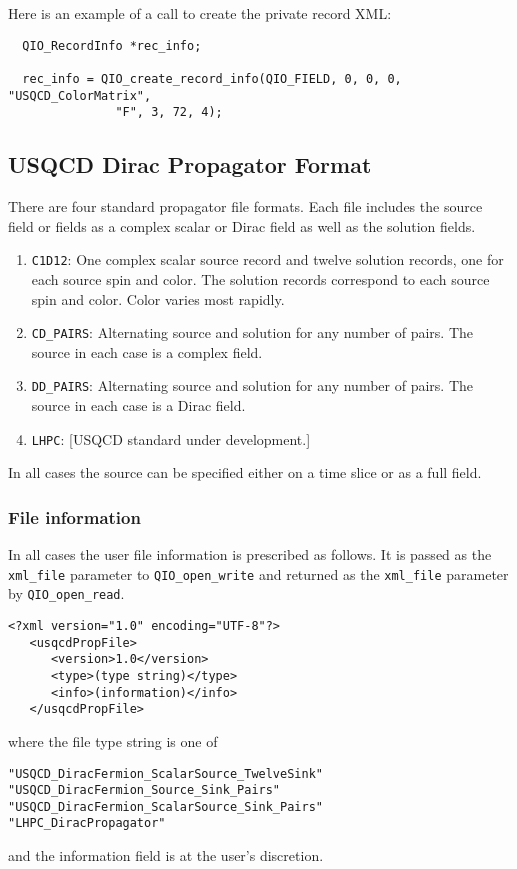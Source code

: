 \documentclass{article}
\begin{document}
Here is an example of a call to create the private record XML:

\begin{verbatim}
  QIO_RecordInfo *rec_info;

  rec_info = QIO_create_record_info(QIO_FIELD, 0, 0, 0, "USQCD_ColorMatrix",
               "F", 3, 72, 4); 
\end{verbatim}


\subsection{USQCD Dirac Propagator Format}

There are four standard propagator file formats.  Each file includes
the source field or fields as a complex scalar or Dirac field as well
as the solution fields.
%
\begin{enumerate}
\item \verb|C1D12|: One complex scalar source record and twelve solution 
      records, one for each source spin and color.  The solution
      records correspond to each source spin and color.  Color varies
      most rapidly.
\item \verb|CD_PAIRS|: Alternating source and solution for any number of pairs.
      The source in each case is a complex field.
\item \verb|DD_PAIRS|: Alternating source and solution for any number of pairs.
      The source in each case is a Dirac field.
\item \verb|LHPC|: [USQCD standard under development.]
\end{enumerate}
%
In all cases the source can be specified either on a time slice or as
a full field.

\subsubsection{File information}

In all cases the user file information is prescribed as follows.  It
is passed as the \verb|xml_file| parameter to \verb|QIO_open_write| and
returned as the \verb|xml_file| parameter by \verb|QIO_open_read|.

\begin{verbatim}
<?xml version="1.0" encoding="UTF-8"?>
   <usqcdPropFile>
      <version>1.0</version>
      <type>(type string)</type>
      <info>(information)</info>
   </usqcdPropFile>
\end{verbatim}
%
where the file type string is one of
%
\begin{verbatim}
"USQCD_DiracFermion_ScalarSource_TwelveSink"
"USQCD_DiracFermion_Source_Sink_Pairs"
"USQCD_DiracFermion_ScalarSource_Sink_Pairs"
"LHPC_DiracPropagator"
\end{verbatim}
%
and the information field is at the user's discretion.
\end{document}
